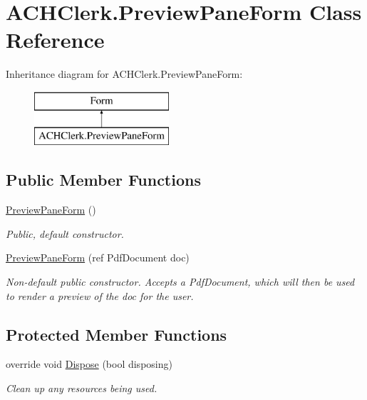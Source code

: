 \hypertarget{class_a_c_h_clerk_1_1_preview_pane_form}{\section{A\+C\+H\+Clerk.\+Preview\+Pane\+Form Class Reference}
\label{class_a_c_h_clerk_1_1_preview_pane_form}
}
Inheritance diagram for A\+C\+H\+Clerk.\+Preview\+Pane\+Form\+:\begin{figure}[H]
\begin{center}
\leavevmode
\includegraphics[height=2.000000cm]{class_a_c_h_clerk_1_1_preview_pane_form}
\end{center}
\end{figure}
\subsection*{Public Member Functions}
\begin{DoxyCompactItemize}
\item 
\hyperlink{class_a_c_h_clerk_1_1_preview_pane_form_a550330415c90452efd0750671054066c}{Preview\+Pane\+Form} ()
\begin{DoxyCompactList}\small\item\em Public, default constructor. \end{DoxyCompactList}\item 
\hyperlink{class_a_c_h_clerk_1_1_preview_pane_form_a6ab15c2a4a0f91e09dd758b26e797002}{Preview\+Pane\+Form} (ref Pdf\+Document doc)
\begin{DoxyCompactList}\small\item\em Non-\/default public constructor. Accepts a Pdf\+Document, which will then be used to render a preview of the doc for the user. \end{DoxyCompactList}\end{DoxyCompactItemize}
\subsection*{Protected Member Functions}
\begin{DoxyCompactItemize}
\item 
override void \hyperlink{class_a_c_h_clerk_1_1_preview_pane_form_aae2f2fdd34c0de02247b2682be051af1}{Dispose} (bool disposing)
\begin{DoxyCompactList}\small\item\em Clean up any resources being used. \end{DoxyCompactList}\end{DoxyCompactItemize}


